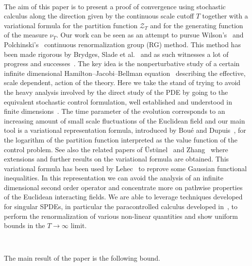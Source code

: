 \documentclass[11pt, oneside]{article}   	%
\newcommand{\CZ}{\mathscr{Z}}
\begin{document}
\

The aim of this paper is to present a proof of convergence using stochastic
calculus along the direction given by the continuous scale cutoff $T$ together
with a variational formula for the partition function $\CZ_T$ and for the
generating function of the measure $\nu_T$. Our work can be seen as an attempt
to pursue Wilson's~{\cite{wilson_renormalization_1983}} and
Polchinski's~{\cite{polchinski_renormalization_1984}} continuous
renormalization group (RG) method. This method has been made rigorous by
Brydges, Slade et
al.~{\cite{brydges_functional_1993,brydges_short_1995,brydges_lectures_2009}}
and as such witnesses a lot of progress and
successes~{\cite{brydges_renormalisation_2014_3,brydges_renormalisation_2014_2,bauerschmidt_renormalisation_2014,brydges_renormalisation_2014_1,brydges_renormalisation_2014,brydges_short_1995}}.
The key idea is the nonperturbative study of a certain infinite dimensional
Hamilton--Jacobi--Bellman equation~{\cite{brydges_mayer_1987}} describing the
effective, scale dependent, action of the theory. Here we take the stand of
trying to avoid the heavy analysis involved by the direct study of the PDE by
going to the equivalent stochastic control formulation, well established and
understood in finite dimensions~{\cite{fleming_controlled_2005}}. The time
parameter of the evolution corresponds to an increasing amount of small scale
fluctuations of the Euclidean field and our main tool is a variational
representation formula, introduced by Bou{\'e} and
Dupuis~{\cite{boue_variational_1998}}, for the logarithm of the partition
function interpreted as the value function of the control problem. See also
the related papers of {\"U}st{\"u}nel~{\cite{ustunel_variational_2014}} and
Zhang~{\cite{zhang_variational_2009}} where extensions and further results on
the variational formula are obtained. This variational formula has been used
by Lehec~{\cite{lehec_representation_2013}} to reprove some Gaussian
functional inequalities. In this representation we can avoid the analysis of
an infinite dimensional second order operator and concentrate more on pathwise
properties of the Euclidean interacting fields. We are able to leverage
techniques developed for singular SPDEs, in particular the paracontrolled
calculus developed in~{\cite{gubinelli_paracontrolled_2015}}, to perform the
renormalization of various non-linear quantities and show uniform bounds in
the $T \rightarrow \infty$ limit.

\

The main result of the paper is the following bound.
\end{document}
